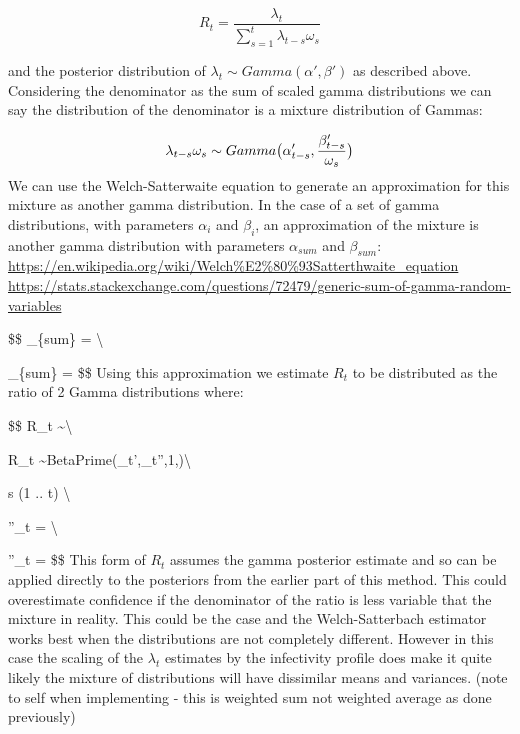 \documentclass[
]{article}
\begin{document}
\[
R_t = \frac{\lambda_t}{\sum_{s=1}^t \lambda_{t-s}\omega_s}
\]

and the posterior distribution of
\(\lambda_t \sim Gamma(\alpha',\beta')\) as described above. Considering
the denominator as the sum of scaled gamma distributions we can say the
distribution of the denominator is a mixture distribution of Gammas:

\[
\lambda_{t-s}\omega_s \sim Gamma\big(\alpha'_{t-s}, \frac{\beta'_{t-s}}{\omega_s}\big)\\ 
\] We can use the Welch-Satterwaite equation to generate an
approximation for this mixture as another gamma distribution. In the
case of a set of gamma distributions, with parameters \(\alpha_i\) and
\(\beta_i\), an approximation of the mixture is another gamma
distribution with parameters \(\alpha_{sum}\) and \(\beta_{sum}\):
\url{https://en.wikipedia.org/wiki/Welch\%E2\%80\%93Satterthwaite_equation}
\url{https://stats.stackexchange.com/questions/72479/generic-sum-of-gamma-random-variables}

\$\$ \alpha\_\{sum\} = \textbackslash{}

\beta\_\{sum\} =  \$\$ Using this approximation we estimate \(R_t\) to be distributed as
the ratio of 2 Gamma distributions where:

\$\$ R\_t \sim {}\textbackslash{}

R\_t
\sim BetaPrime(\alpha\_t',\alpha\_t'',1,)\textbackslash{}

 s \in (1 .. t) \textbackslash{}

\alpha''\_t = \textbackslash{}

\beta''\_t =  \$\$ This form of \(R_t\) assumes the gamma posterior estimate and so
can be applied directly to the posteriors from the earlier part of this
method. This could overestimate confidence if the denominator of the
ratio is less variable that the mixture in reality. This could be the
case and the Welch-Satterbach estimator works best when the
distributions are not completely different. However in this case the
scaling of the \(\lambda_t\) estimates by the infectivity profile does
make it quite likely the mixture of distributions will have dissimilar
means and variances. (note to self when implementing - this is weighted
sum not weighted average as done previously)
\end{document}
